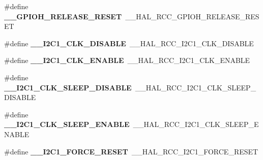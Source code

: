 \begin{DoxyCompactItemize}
\item 
\#define {\bfseries \+\_\+\+\_\+\+G\+P\+I\+O\+H\+\_\+\+R\+E\+L\+E\+A\+S\+E\+\_\+\+R\+E\+S\+ET}~\+\_\+\+\_\+\+H\+A\+L\+\_\+\+R\+C\+C\+\_\+\+G\+P\+I\+O\+H\+\_\+\+R\+E\+L\+E\+A\+S\+E\+\_\+\+R\+E\+S\+ET\hypertarget{group___h_a_l___r_c_c___aliased_ga1a00e4a8dc1e9bfbf9c4396ff1344315}{}\label{group___h_a_l___r_c_c___aliased_ga1a00e4a8dc1e9bfbf9c4396ff1344315}

\item 
\#define {\bfseries \+\_\+\+\_\+\+I2\+C1\+\_\+\+C\+L\+K\+\_\+\+D\+I\+S\+A\+B\+LE}~\+\_\+\+\_\+\+H\+A\+L\+\_\+\+R\+C\+C\+\_\+\+I2\+C1\+\_\+\+C\+L\+K\+\_\+\+D\+I\+S\+A\+B\+LE\hypertarget{group___h_a_l___r_c_c___aliased_gad83d5f0a6ae6eef9cf5a0daf817c8e41}{}\label{group___h_a_l___r_c_c___aliased_gad83d5f0a6ae6eef9cf5a0daf817c8e41}

\item 
\#define {\bfseries \+\_\+\+\_\+\+I2\+C1\+\_\+\+C\+L\+K\+\_\+\+E\+N\+A\+B\+LE}~\+\_\+\+\_\+\+H\+A\+L\+\_\+\+R\+C\+C\+\_\+\+I2\+C1\+\_\+\+C\+L\+K\+\_\+\+E\+N\+A\+B\+LE\hypertarget{group___h_a_l___r_c_c___aliased_ga57473cd6a4f76fedbac6dae08c8c6e78}{}\label{group___h_a_l___r_c_c___aliased_ga57473cd6a4f76fedbac6dae08c8c6e78}

\item 
\#define {\bfseries \+\_\+\+\_\+\+I2\+C1\+\_\+\+C\+L\+K\+\_\+\+S\+L\+E\+E\+P\+\_\+\+D\+I\+S\+A\+B\+LE}~\+\_\+\+\_\+\+H\+A\+L\+\_\+\+R\+C\+C\+\_\+\+I2\+C1\+\_\+\+C\+L\+K\+\_\+\+S\+L\+E\+E\+P\+\_\+\+D\+I\+S\+A\+B\+LE\hypertarget{group___h_a_l___r_c_c___aliased_ga7bbdc41f3b1b13f8fe2a9c090050ed7f}{}\label{group___h_a_l___r_c_c___aliased_ga7bbdc41f3b1b13f8fe2a9c090050ed7f}

\item 
\#define {\bfseries \+\_\+\+\_\+\+I2\+C1\+\_\+\+C\+L\+K\+\_\+\+S\+L\+E\+E\+P\+\_\+\+E\+N\+A\+B\+LE}~\+\_\+\+\_\+\+H\+A\+L\+\_\+\+R\+C\+C\+\_\+\+I2\+C1\+\_\+\+C\+L\+K\+\_\+\+S\+L\+E\+E\+P\+\_\+\+E\+N\+A\+B\+LE\hypertarget{group___h_a_l___r_c_c___aliased_gae34832665142d53a98bf833c9f9558b8}{}\label{group___h_a_l___r_c_c___aliased_gae34832665142d53a98bf833c9f9558b8}

\item 
\#define {\bfseries \+\_\+\+\_\+\+I2\+C1\+\_\+\+F\+O\+R\+C\+E\+\_\+\+R\+E\+S\+ET}~\+\_\+\+\_\+\+H\+A\+L\+\_\+\+R\+C\+C\+\_\+\+I2\+C1\+\_\+\+F\+O\+R\+C\+E\+\_\+\+R\+E\+S\+ET\hypertarget{group___h_a_l___r_c_c___aliased_gae84da6d623ad78feba69961ea4f776bf}{}\label{group___h_a_l___r_c_c___aliased_gae84da6d623ad78feba69961ea4f776bf}


\end{DoxyCompactItemize}
